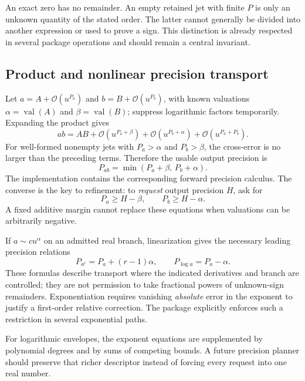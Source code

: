 \documentclass[11pt,a4paper]{article}
\newcommand{\OO}{\mathcal O}
\newcommand{\val}{\operatorname{val}}
\begin{document}
An exact zero has no remainder. An empty retained jet with finite $P$ is only an unknown quantity of the stated order. The latter cannot generally be divided into another expression or used to prove a sign. This distinction is already respected in several package operations and should remain a central invariant.\cite{core,ops,arithmetic}

\subsection{Product and nonlinear precision transport}

Let $a=A+\OO(u^{P_a})$ and $b=B+\OO(u^{P_b})$, with known valuations $\alpha=\val(A)$ and $\beta=\val(B)$; suppress logarithmic factors temporarily. Expanding the product gives
\begin{equation}\label{eq:producterror}
 ab=AB+\OO(u^{P_a+\beta})+\OO(u^{P_b+\alpha})
       +\OO(u^{P_a+P_b}).
\end{equation}
For well-formed nonempty jets with $P_a>\alpha$ and $P_b>\beta$, the cross-error is no larger than the preceding terms. Therefore the usable output precision is
\begin{equation}\label{eq:productprecision}
 P_{ab}=\min(P_a+\beta,\,P_b+\alpha).
\end{equation}
The implementation contains the corresponding forward precision calculus. The converse is the key to refinement: to \emph{request} output precision $H$, ask for
\begin{equation}\label{eq:backwardprecision}
 P_a\ge H-\beta,\qquad P_b\ge H-\alpha.
\end{equation}
A fixed additive margin cannot replace these equations when valuations can be arbitrarily negative.

If $a\sim c u^\alpha$ on an admitted real branch, linearization gives the necessary leading precision relations
\begin{equation}\label{eq:nonlinearprecision}
 P_{a^r}=P_a+(r-1)\alpha,\qquad
 P_{\log a}=P_a-\alpha.
\end{equation}
These formulas describe transport where the indicated derivatives and branch are controlled; they are not permission to take fractional powers of unknown-sign remainders. Exponentiation requires vanishing \emph{absolute} error in the exponent to justify a first-order relative correction. The package explicitly enforces such a restriction in several exponential paths.\cite{ops,native}

For logarithmic envelopes, the exponent equations are supplemented by polynomial degrees and by sums of competing bounds. A future precision planner should preserve that richer descriptor instead of forcing every request into one real number.
\end{document}
